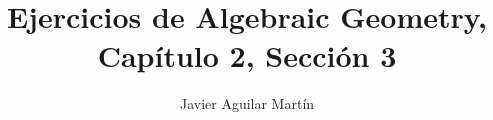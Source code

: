 \documentclass[twoside]{article}
\begin{document}
\title{Ejercicios de Algebraic Geometry, Capítulo 2, Sección 3}
\author{Javier Aguilar Martín}
\maketitle



%
%
%
%
%
%
%
\end{document}
